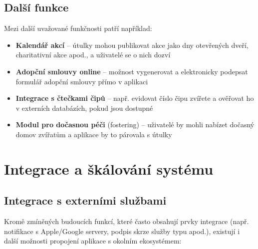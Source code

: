 \documentclass[czech, bp, kiv, he, iso690numb, pdf]{fasthesis}
\begin{document}
    \subsection*{Další funkce}

    Mezi další uvažované funkčnosti patří například:

    \begin{itemize}
        \item \textbf{Kalendář akcí} – útulky mohou publikovat akce jako dny otevřených dveří, charitativní akce apod., a uživatelé se o nich dozví

        \item \textbf{Adopční smlouvy online} – možnost vygenerovat a elektronicky podepsat formulář adopční smlouvy přímo v aplikaci

        \item \textbf{Integrace s čtečkami čipů} – např. evidovat číslo čipu zvířete a ověřovat ho v externích databázích, pokud jsou dostupné

        \item \textbf{Modul pro dočasnou péči} (fostering) – uživatelé by mohli nabízet dočasný domov zvířatům a aplikace by to párovala s útulky
    \end{itemize}

    \section{Integrace a škálování systému}

    \subsection*{Integrace s externími službami}

    Kromě zmíněných budoucích funkcí, které často obsahují prvky integrace (např. notifikace s Apple/Google servery, podpis skrze služby typu  apod.), existují i další možnosti propojení aplikace s okolním ekosystémem:
\end{document}
